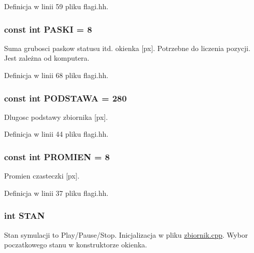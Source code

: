 Definicja w linii 59 pliku flagi.\-hh.

\hypertarget{flagi_8hh_afa380d01dc08ee237b4eea9046704397}{
\subsubsection[{P\-A\-S\-K\-I}]{\setlength{\rightskip}{0pt plus 5cm}const int P\-A\-S\-K\-I = 8}}\label{flagi_8hh_afa380d01dc08ee237b4eea9046704397}
Suma grubosci paskow statusu itd. okienka \mbox{[}px\mbox{]}. Potrzebne do liczenia pozycji. Jest zależna od komputera. 

Definicja w linii 68 pliku flagi.\-hh.

\hypertarget{flagi_8hh_acd3c5814c051e565bf7854f6403acf49}{
\subsubsection[{P\-O\-D\-S\-T\-A\-W\-A}]{\setlength{\rightskip}{0pt plus 5cm}const int P\-O\-D\-S\-T\-A\-W\-A = 280}}\label{flagi_8hh_acd3c5814c051e565bf7854f6403acf49}
Dlugosc podstawy zbiornika \mbox{[}px\mbox{]}. 

Definicja w linii 44 pliku flagi.\-hh.

\hypertarget{flagi_8hh_aa77f856f3142a9e81752665a9bc2e6de}{
\subsubsection[{P\-R\-O\-M\-I\-E\-N}]{\setlength{\rightskip}{0pt plus 5cm}const int P\-R\-O\-M\-I\-E\-N = 8}}\label{flagi_8hh_aa77f856f3142a9e81752665a9bc2e6de}
Promien czasteczki \mbox{[}px\mbox{]}. 

Definicja w linii 37 pliku flagi.\-hh.

\hypertarget{flagi_8hh_ae3a120c63186a17e4127a68187b3e9e8}{
\subsubsection[{S\-T\-A\-N}]{\setlength{\rightskip}{0pt plus 5cm}int S\-T\-A\-N}}\label{flagi_8hh_ae3a120c63186a17e4127a68187b3e9e8}
Stan symulacji to Play/\-Pause/\-Stop. Inicjalizacja w pliku \hyperlink{zbiornik_8cpp}{zbiornik.\-cpp}. Wybor poczatkowego stanu w konstruktorze okienka.

